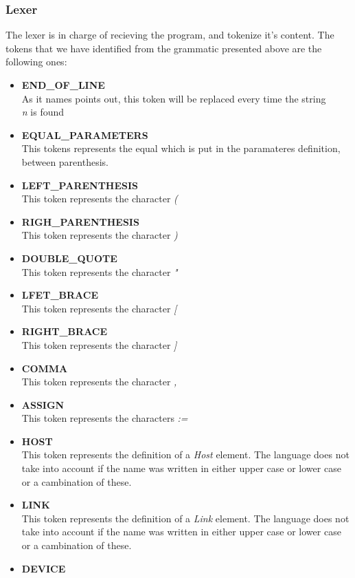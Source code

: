 \subsubsection{Lexer}

The lexer is in charge of recieving the program, and tokenize it's content. The tokens that we have identified from the grammatic presented above are the following ones: 
\begin{itemize}
\item \textbf{END\_OF\_LINE}\\
As it names points out, this token will be replaced every time the string \textit{\\n} is found
\item \textbf{EQUAL\_PARAMETERS}\\
This tokens represents the equal which is put in the paramateres definition, between parenthesis.
\item \textbf{LEFT\_PARENTHESIS}\\
This token represents the character \textit{(}
\item \textbf{RIGH\_PARENTHESIS}\\
This token represents the character \textit{)}
\item \textbf{DOUBLE\_QUOTE}\\
This token represents the character \textit{"}
\item \textbf{LFET\_BRACE}\\
This token represents the character \textit{[}
\item \textbf{RIGHT\_BRACE}\\
This token represents the character \textit{]}
\item \textbf{COMMA}\\
This token represents the character \textit{,}
\item \textbf{ASSIGN}\\
This token represents the characters \textit{:=}
\item \textbf{HOST}\\
This token represents the definition of a \textit{Host} element. The language does not take into account if the name was written in either upper case or lower case or a cambination of these.
\item \textbf{LINK}\\
This token represents the definition of a \textit{Link} element. The language does not take into account if the name was written in either upper case or lower case or a cambination of these.
\item \textbf{DEVICE}\\

\end{itemize}
